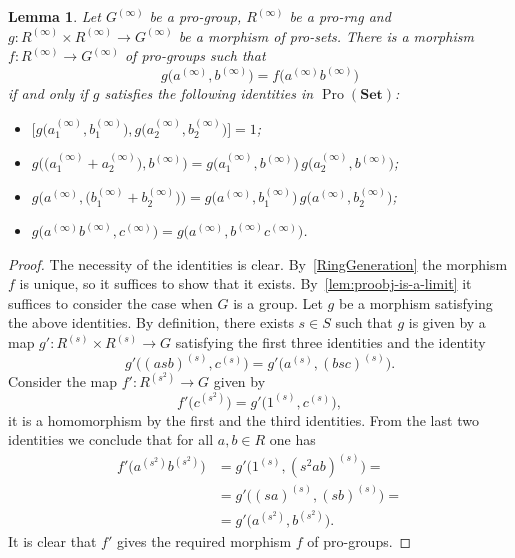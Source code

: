 \documentclass{article}
\newtheorem{lemma}{Lemma} \numberwithin{lemma}{section}
\theoremstyle{definition}
\theoremstyle{remark}
\DeclareMathOperator{\Pro}{Pro}
\newcommand{\Set}{\mathbf{Set}}
\begin{document}
\begin{lemma}\label{RingPresentation}
Let \(G^{(\infty)}\) be a pro-group, $R^{(\infty)}$ be a pro-rng and \(g \colon R^{(\infty)} \times R^{(\infty)} \to G^{(\infty)}\) be a morphism of pro-sets. There is a morphism \(f \colon R^{(\infty)} \to G^{(\infty)}\) of pro-groups such that
\[g\bigl(a^{(\infty)} , b^{(\infty)}\bigr) = f\bigl(a^{(\infty)} b^{(\infty)}\bigr)\]
if and only if \(g\) satisfies the following identities in $\Pro(\Set)$:
\begin{itemize}
\item \(\bigl[g\bigl(a_1^{(\infty)}, b_1^{(\infty)}\bigr), g\bigl(a_2^{(\infty)}, b_2^{(\infty)}\bigr)\bigr] = 1\);
\item \(g\bigl(\bigl(a_1^{(\infty)} + a_2^{(\infty)}\bigr), b^{(\infty)}\bigr) = g\bigl(a_1^{(\infty)}, b^{(\infty)}\bigr)\, g\bigl(a_2^{(\infty)}, b^{(\infty)}\bigr)\);
\item \(g\bigl(a^{(\infty)}, \bigl(b_1^{(\infty)} + b_2^{(\infty)}\bigr)\bigr) = g\bigl(a^{(\infty)}, b_1^{(\infty)}\bigr)\, g\bigl(a^{(\infty)}, b_2^{(\infty)}\bigr)\);
\item \(g\bigl(a^{(\infty)} b^{(\infty)}, c^{(\infty)}\bigr) = g\bigl(a^{(\infty)}, b^{(\infty)} c^{(\infty)}\bigr)\).
\end{itemize}
\end{lemma}
\begin{proof}
The necessity of the identities is clear.
By~\cref{RingGeneration} the morphism \(f\) is unique, so it suffices to show that it exists.
By~\cref{lem:proobj-is-a-limit} it suffices to consider the case when \(G\) is a group. 
Let \(g\) be a morphism satisfying the above identities.
By definition, there exists $s\in S$ such that $g$ is given by a map \(g' \colon R^{(s)} \times R^{(s)} \to G\) satisfying the first three identities and the identity 
\[g'\bigl((asb)^{(s)}, c^{(s)}\bigr) = g'\bigl(a^{(s)}, (bsc)^{(s)}\bigr).\]
Consider the map \(f' \colon R^{(s^2)} \to G\) given by
\[f'\bigl(c^{(s^2)}\bigr) = g'\bigl(1^{(s)}, c^{(s)}\bigr),\]
it is a homomorphism by the first and the third identities.
From the last two identities we conclude that for all \(a, b \in R\) one has
\begin{align*}
f'\bigl(a^{(s^2)} b^{(s^2)})
&= g' \bigl( 1^{(s)}, (s^2 ab)^{(s)} \bigr) =\\
&= g' \bigl( (sa)^{(s)}, (sb)^{(s)} \bigr) =\\
&= g' \bigl(a^{(s^2)}, b^{(s^2)}\bigr).
\end{align*}
It is clear that \(f'\) gives the required morphism \(f\) of pro-groups.
\end{proof}
\end{document}
